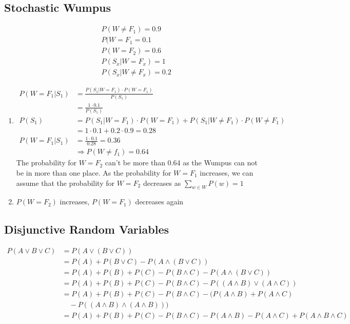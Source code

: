 \documentclass[fleqn,12pt]{scrartcl}
\begin{document}
\subsection{Stochastic Wumpus}
\begin{align*}
	&P(W\not =F_1) = 0.9\\
	&P(W = F_1 = 0.1\\
	&P(W = F_2) = 0.6\\
	&P(S_x | W = F_x) = 1\\
	&P(S_x | W \not = F_x) = 0.2
\end{align*}
\begin{enumerate}
	\item
		\begin{align*}
			P(W=F_1 | S_1) &= \frac{P(S_1 | W=F_1) \cdot P(W=F_1)}{P(S_1)}\\
									 &= \frac{1\cdot 0.1}{P(S_1)}\\
			P(S_1) &= P(S_1 | W=F_1) \cdot P(W=F_1) + P(S_1 | W \not = F_1) \cdot P(W \not = F_1)\\
						 &= 1\cdot 0.1 + 0.2 \cdot 0.9 = 0.28\\
			P(W= F_1| S_1) &= \frac{1\cdot 0.1}{0.28} = 0.36\\
														&\Rightarrow P(W \not = f_1) = 0.64
		\end{align*}
		The probability for $W=F_2$ can't be more than 0.64 as the Wumpus can not be in more than one place. As the probability for $W=F_1$ increases, we can assume that the probability for $W=F_2$ decreases as $\sum_{w\in W} P(w) = 1$
	\item
		$P(W= F_2)$ increases, $P(W= F_1)$ decreases again
\end{enumerate}
\subsection{Disjunctive Random Variables}
\begin{align*}
	P(A \vee B \vee C) &= P(A \vee (B\vee C))\\
										 &=P(A) + P(B\vee C) - P(A \wedge (B\vee C))\\
	&= P(A) + P(B) + P(C) - P(B\wedge C) - P(A \wedge (B\vee C))\\
																	 &= P(A) + P(B) + P(C) - P(B\wedge C) - P((A \wedge B) \vee (A\wedge C))\\
																	 &= P(A) + P(B) + P(C) - P(B\wedge C) - (P(A\wedge B) + P(A\wedge C) \\ &\quad - P((A\wedge B) \wedge (A\wedge B)))\\
																	 &= P(A) + P(B) + P(C) - P(B\wedge C) - P(A\wedge B) - P(A\wedge C) + P(A\wedge B \wedge C)\\
\end{align*}
\end{document}
